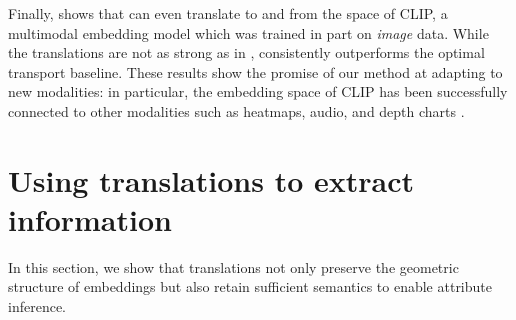 Finally,  shows that \atk{} can even translate to and from the space of CLIP, a multimodal embedding model which was trained in part on \emph{image} data.  While the translations are not as strong as in , \atk{} consistently outperforms the optimal transport baseline. These results show the promise of our method at adapting to new modalities: in particular, the embedding space of CLIP has been successfully connected to other modalities such as heatmaps, audio, and depth charts \citep{girdhar2023imagebind}.







\section{Using \atk{} translations to extract information}
\label{sec:eval_semantics}

In this section, we show that \atk{} translations not only preserve the geometric structure of embeddings but also retain sufficient semantics to enable attribute inference.




